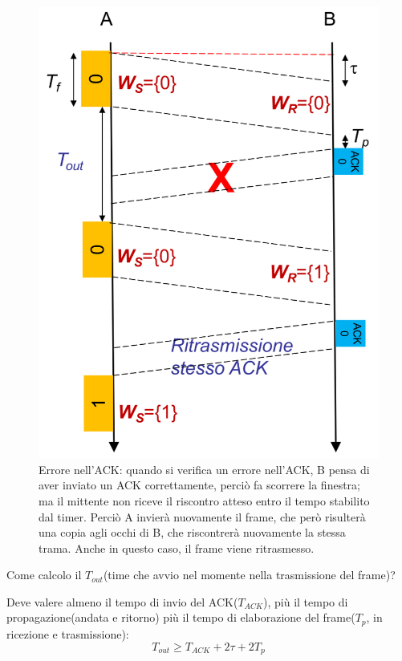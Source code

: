 \begin{figure}[htbp]
\begin{minipage}{0.42\textwidth}
    \end{minipage}%
    \hfill
    \begin{minipage}{0.44\textwidth}
        \includegraphics[width=\linewidth]{images/erroreack.png}
        \caption{Errore nell'ACK: quando si verifica un errore nell'ACK, B pensa di aver inviato un ACK correttamente, perciò fa scorrere la finestra; ma il mittente non riceve il riscontro atteso entro il tempo stabilito dal timer. Perciò A invierà nuovamente il frame, che però risulterà una copia agli occhi di B, che riscontrerà nuovamente la stessa trama. 
        Anche in questo caso, il frame viene ritrasmesso. }
    \end{minipage}
\end{figure}

Come calcolo il $T_{out}$(time che avvio nel momente nella trasmissione del frame)?

Deve valere almeno il tempo di invio del ACK($T_{ACK}$), più il tempo di propagazione(andata e ritorno) più il tempo di elaborazione del frame($T_p$, in ricezione e trasmissione):
\begin{equation}
T_{out} \geq T_{ACK} + 2\tau + 2T_p
\end{equation}

